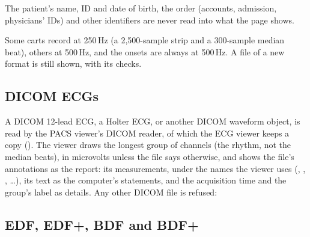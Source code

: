 The patient's name, ID and date of birth, the order (accounts, admission, physicians' IDs) and
other identifiers are never read into what the page shows.

Some carts record at 250\,Hz (a 2{,}500-sample strip and a
300-sample median beat), others at 500\,Hz, and the onsets are always at 500\,Hz. A file of a new
format is still shown, with its checks.

\subsection{DICOM ECGs}
\label{sec:ecg-viewer-dicom}

A DICOM 12-lead ECG, a Holter ECG, or another DICOM waveform object, is read by the PACS viewer's
DICOM reader, of which the ECG viewer keeps a copy (). The viewer draws the longest
group of channels (the rhythm, not the median beats), in microvolts unless the file says
otherwise, and shows the file's annotations as the report: its measurements, under the names the
viewer uses (, , , \dots), its text as the computer's
statements, and the acquisition time and the group's label as details. Any other DICOM file is
refused: 

\subsection{EDF, EDF+, BDF and BDF+}
\label{sec:ecg-viewer-edf}

